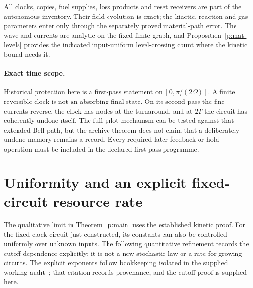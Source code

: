 \documentclass[11pt,oneside,openany]{book}
\theoremstyle{definition}
\theoremstyle{remark}\newtheorem{remark}[theorem]{Remark}
\begin{document}
All clocks, copies, fuel supplies, loss products and reset receivers
are part of the autonomous inventory.  Their field evolution is
exact; the kinetic, reaction and gas parameters enter only through
the separately proved material-path error.  The wave and currents
are analytic on the fixed finite graph, and
Proposition~\ref{p:mat-levels} provides the indicated input-uniform
level-crossing count where the kinetic bound needs it.

\paragraph{Exact time scope.}
Historical protection here is a first-pass statement on
$[0,\pi/(2\Omega)]$.  A finite reversible clock is not an absorbing
final state.  On its second pass the fine currents reverse, the
clock has nodes at the turnaround, and at $2T$ the circuit has
coherently undone itself.  The full pilot mechanism can be tested
against that extended Bell path, but the archive theorem does not
claim that a deliberately undone memory remains a record.  Every
required later feedback or hold operation must be included in the
declared first-pass programme.



\section{Uniformity and an explicit fixed-circuit resource rate}
\label{p:uniformity}
The qualitative limit in Theorem~\ref{p:main} uses the established
kinetic proof.  For the fixed clock circuit just constructed, its constants
can also be controlled uniformly over unknown inputs.  The following
quantitative refinement records the cutoff dependence explicitly; it is
not a new stochastic law or a rate for growing circuits.  The explicit
exponents follow bookkeeping isolated in the supplied working
audit~\cite{pIndependentAudit}; that citation records provenance, and the
cutoff proof is supplied here.
\end{document}
